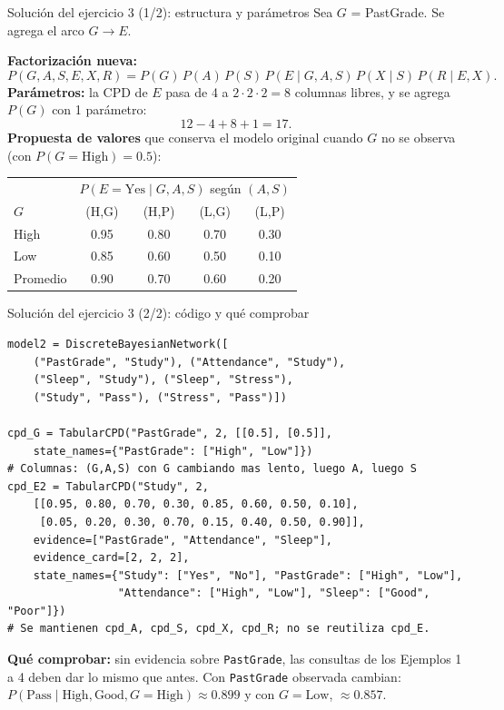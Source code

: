 \documentclass[11pt]{beamer}
\newcommand{\Pp}[1]{P\!\left(#1\right)}
\begin{document}
\begin{frame}{Solución del ejercicio 3 (1/2): estructura y parámetros}
  Sea $G$ = PastGrade. Se agrega el arco $G\to E$.

  \medskip
  \textbf{Factorización nueva:}
  {\small
  \[
    \Pp{G,A,S,E,X,R}=\Pp{G}\,\Pp{A}\,\Pp{S}\,\Pp{E\mid G,A,S}\,\Pp{X\mid S}\,\Pp{R\mid E,X}.
  \]}
  \textbf{Parámetros:} la CPD de $E$ pasa de 4 a $2\cdot2\cdot2=8$ columnas libres, y se agrega $\Pp{G}$ con 1 parámetro:
  \[
    12-4+8+1=17.
  \]
  \textbf{Propuesta de valores} que conserva el modelo original cuando $G$ no se observa (con $\Pp{G=\text{High}}=0.5$):

  \small
  \begin{center}
  \begin{tabular}{lcccc}
    \toprule
    & \multicolumn{4}{c}{$\Pp{E=\text{Yes}\mid G,A,S}$ según $(A,S)$} \\
    $G$ & (H,G) & (H,P) & (L,G) & (L,P) \\
    \midrule
    High & 0.95 & 0.80 & 0.70 & 0.30 \\
    Low  & 0.85 & 0.60 & 0.50 & 0.10 \\
    Promedio   & 0.90 & 0.70 & 0.60 & 0.20 \\
    \bottomrule
  \end{tabular}
  \end{center}
\end{frame}

\begin{frame}[fragile]{Solución del ejercicio 3 (2/2): código y qué comprobar}
\begin{lstlisting}
model2 = DiscreteBayesianNetwork([
    ("PastGrade", "Study"), ("Attendance", "Study"),
    ("Sleep", "Study"), ("Sleep", "Stress"),
    ("Study", "Pass"), ("Stress", "Pass")])

cpd_G = TabularCPD("PastGrade", 2, [[0.5], [0.5]],
    state_names={"PastGrade": ["High", "Low"]})
# Columnas: (G,A,S) con G cambiando mas lento, luego A, luego S
cpd_E2 = TabularCPD("Study", 2,
    [[0.95, 0.80, 0.70, 0.30, 0.85, 0.60, 0.50, 0.10],
     [0.05, 0.20, 0.30, 0.70, 0.15, 0.40, 0.50, 0.90]],
    evidence=["PastGrade", "Attendance", "Sleep"],
    evidence_card=[2, 2, 2],
    state_names={"Study": ["Yes", "No"], "PastGrade": ["High", "Low"],
                 "Attendance": ["High", "Low"], "Sleep": ["Good", "Poor"]})
# Se mantienen cpd_A, cpd_S, cpd_X, cpd_R; no se reutiliza cpd_E.
\end{lstlisting}
  \small
  \textbf{Qué comprobar:} sin evidencia sobre \texttt{PastGrade}, las consultas de los Ejemplos 1 a 4 deben dar lo mismo que antes. Con \texttt{PastGrade} observada cambian: $\Pp{\text{Pass}\mid\text{High},\text{Good},G=\text{High}}\approx0.899$ y con $G=\text{Low}$, $\approx0.857$.
\end{frame}
\end{document}
